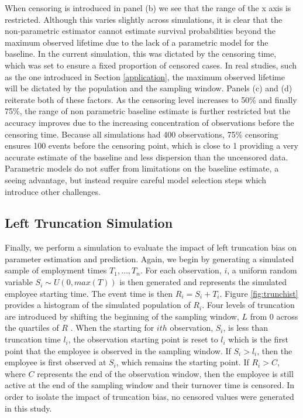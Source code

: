 \documentclass[12pt,letterpaper]{article}
\begin{document}
When censoring is introduced in panel (b) we see that the range of the x axis is restricted.  Although this varies slightly across simulations, it is clear that the non-parametric estimator cannot estimate survival probabilities beyond the maximum observed lifetime due to the lack of a parametric model for the baseline.  In the current simulation, this was dictated by the censoring time, which was set to ensure a fixed proportion of censored cases.  In real studies, such as the one introduced in Section \ref{application}, the maximum observed lifetime will be dictated by the population and the sampling window.  Panels (c) and (d) reiterate both of these factors. As the censoring level increases to 50\% and finally 75\%, the range of non parametric baseline estimate is further restricted but the accuracy improves due to the increasing concentration of observations before the censoring time.  Because all simulations had 400 observations, 75\% censoring ensures 100 events before the censoring point, which is close to 1 providing a very accurate estimate of the baseline and less dispersion than the uncensored data.  Parametric models do not suffer from limitations on the baseline estimate, a seeing advantage, but instead require careful model selection steps which introduce other challenges.


\subsection{Left Truncation Simulation}

Finally, we perform a simulation to evaluate the impact of left truncation bias on parameter estimation and prediction. Again, we begin by generating a simulated sample of employment times $T_1, \ldots, T_n$.  For each observation, $i$, a uniform random variable $S_i \sim U(0,max(T))$ is then generated and represents the simulated employee starting time. The event time is then $R_i = S_i+T_i$. Figure \ref{fig:trunchist} provides a histogram of the simulated population of $R_i$. Four levels of truncation are introduced by shifting the beginning of the sampling window, $L$ from 0 across the quartiles of $R$ . When the starting for $ith$ observation, $S_i$, is less than truncation time $l_i$, the observation starting point is reset to $l_i$ which is the first point that the employee is observed in the sampling window. If $S_i> l_i$, then the employee is first observed at $S_i$, which remains the starting point.  If $R_i>C$, where $C$ represents the end of the observation window, then the employee is still active at the end of the sampling window and their turnover time is censored.  In order to isolate the impact of truncation bias, no censored values were generated in this study.
\end{document}
